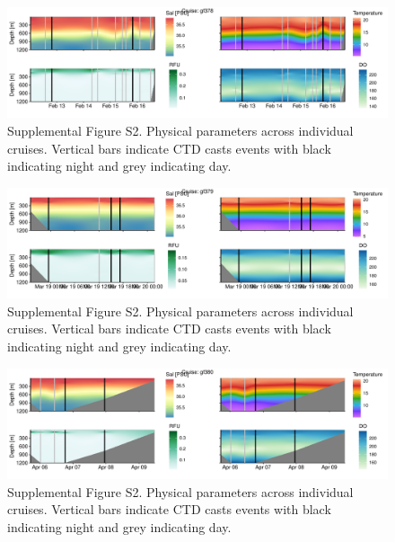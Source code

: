 \documentclass[
]{article}
\begin{document}
\begin{figure}

{\centering \includegraphics[width=1\textwidth,height=\textheight]{index_files/figure-pdf/unnamed-chunk-19-9.pdf}

}

\caption{Supplemental Figure S2. Physical parameters across individual
cruises. Vertical bars indicate CTD casts events with black indicating
night and grey indicating day.}

\end{figure}

\begin{figure}

{\centering \includegraphics[width=1\textwidth,height=\textheight]{index_files/figure-pdf/unnamed-chunk-19-10.pdf}

}

\caption{Supplemental Figure S2. Physical parameters across individual
cruises. Vertical bars indicate CTD casts events with black indicating
night and grey indicating day.}

\end{figure}

\begin{figure}

{\centering \includegraphics[width=1\textwidth,height=\textheight]{index_files/figure-pdf/unnamed-chunk-19-11.pdf}

}

\caption{Supplemental Figure S2. Physical parameters across individual
cruises. Vertical bars indicate CTD casts events with black indicating
night and grey indicating day.}

\end{figure}
\end{document}
